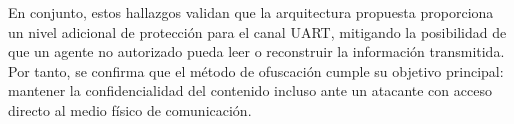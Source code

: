 En conjunto, estos hallazgos validan que la arquitectura propuesta proporciona un nivel adicional de protección para el canal UART, mitigando la posibilidad de que un agente no autorizado pueda leer o reconstruir la información transmitida. Por tanto, se confirma que el método de ofuscación cumple su objetivo principal: mantener la confidencialidad del contenido incluso ante un atacante con acceso directo al medio físico de comunicación.



\endinput 